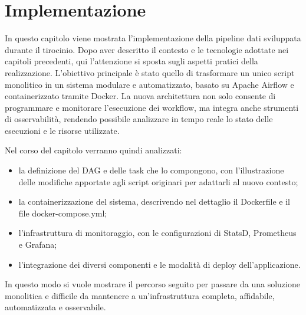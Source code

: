 \chapter{Implementazione}
\label{cha:implementazione}

In questo capitolo viene mostrata l'implementazione della pipeline dati sviluppata durante
il tirocinio. Dopo aver descritto il contesto e le tecnologie adottate nei capitoli precedenti, qui l’attenzione si sposta sugli aspetti pratici della realizzazione.
L’obiettivo principale è stato quello di trasformare un unico script monolitico in un sistema modulare e automatizzato, basato su Apache Airflow e containerizzato tramite Docker. La nuova architettura non solo consente di programmare e monitorare l’esecuzione dei workflow, ma integra anche strumenti di osservabilità, rendendo possibile analizzare in tempo reale lo stato delle esecuzioni e le risorse utilizzate.

Nel corso del capitolo verranno quindi analizzati:


\begin{itemize}
    \item la definizione del DAG e delle task che lo compongono, con l’illustrazione delle modifiche apportate agli script originari per adattarli al nuovo contesto;
    \item la containerizzazione del sistema, descrivendo nel dettaglio il Dockerfile e il file docker-compose.yml;
    \item l’infrastruttura di monitoraggio, con le configurazioni di StatsD, Prometheus e Grafana;
    \item l’integrazione dei diversi componenti e le modalità di deploy dell’applicazione.
\end{itemize}

In questo modo si vuole mostrare il percorso seguito per passare da una soluzione monolitica e difficile da mantenere a un’infrastruttura completa, affidabile, automatizzata e osservabile.

